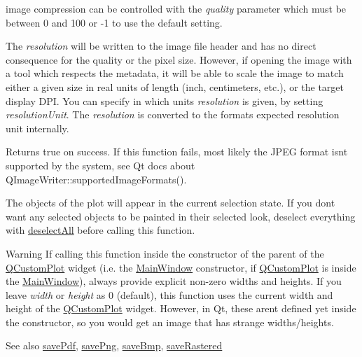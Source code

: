 image compression can be controlled with the {\itshape quality} parameter which must be between 0 and 100 or -\/1 to use the default setting.

The {\itshape resolution} will be written to the image file header and has no direct consequence for the quality or the pixel size. However, if opening the image with a tool which respects the metadata, it will be able to scale the image to match either a given size in real units of length (inch, centimeters, etc.), or the target display D\+PI. You can specify in which units {\itshape resolution} is given, by setting {\itshape resolution\+Unit}. The {\itshape resolution} is converted to the format\textquotesingle{}s expected resolution unit internally.

Returns true on success. If this function fails, most likely the J\+P\+EG format isn\textquotesingle{}t supported by the system, see Qt docs about Q\+Image\+Writer\+::supported\+Image\+Formats().

The objects of the plot will appear in the current selection state. If you don\textquotesingle{}t want any selected objects to be painted in their selected look, deselect everything with \hyperlink{classQCustomPlot_a9d4808ab925b003054085246c92a257c}{deselect\+All} before calling this function.

\begin{DoxyWarning}{Warning}
If calling this function inside the constructor of the parent of the \hyperlink{classQCustomPlot}{Q\+Custom\+Plot} widget (i.\+e. the \hyperlink{classMainWindow}{Main\+Window} constructor, if \hyperlink{classQCustomPlot}{Q\+Custom\+Plot} is inside the \hyperlink{classMainWindow}{Main\+Window}), always provide explicit non-\/zero widths and heights. If you leave {\itshape width} or {\itshape height} as 0 (default), this function uses the current width and height of the \hyperlink{classQCustomPlot}{Q\+Custom\+Plot} widget. However, in Qt, these aren\textquotesingle{}t defined yet inside the constructor, so you would get an image that has strange widths/heights.
\end{DoxyWarning}
\begin{DoxySeeAlso}{See also}
\hyperlink{classQCustomPlot_ad5acd34f6b39c3516887d7e54fec2412}{save\+Pdf}, \hyperlink{classQCustomPlot_ac92cc9256d12f354b40a4be4600b5fb9}{save\+Png}, \hyperlink{classQCustomPlot_ae3a86ed0795670e50afa21759d4fa13d}{save\+Bmp}, \hyperlink{classQCustomPlot_ad7723ce2edfa270632ef42b03a444352}{save\+Rastered} 
\end{DoxySeeAlso}
